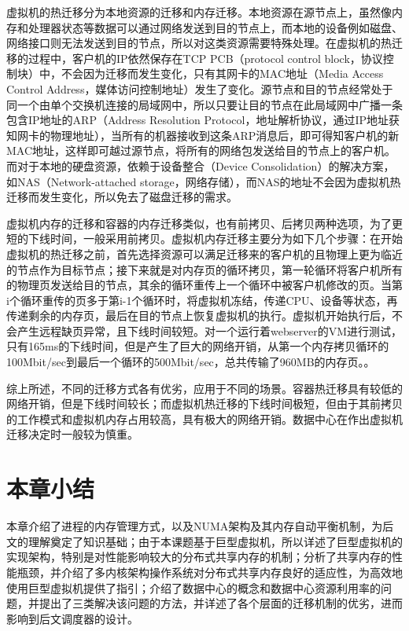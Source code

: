 虚拟机的热迁移\cite{livemigration}分为本地资源的迁移和内存迁移。本地资源在源节点上，虽然像内存和处理器状态等数据可以通过网络发送到目的节点上，而本地的设备例如磁盘、网络接口则无法发送到目的节点，所以对这类资源需要特殊处理。在虚拟机的热迁移的过程中，客户机的IP依然保存在TCP PCB（protocol control block，协议控制块）中，不会因为迁移而发生变化，只有其网卡的MAC地址（Media Access Control Address，媒体访问控制地址）发生了变化。源节点和目的节点经常处于同一个由单个交换机连接的局域网中，所以只要让目的节点在此局域网中广播一条包含IP地址的ARP（Address Resolution Protocol，地址解析协议，通过IP地址获知网卡的物理地址），当所有的机器接收到这条ARP消息后，即可得知客户机的新MAC地址，这样即可越过源节点，将所有的网络包发送给目的节点上的客户机。而对于本地的硬盘资源，依赖于设备整合（Device Consolidation）的解决方案，如NAS（Network-attached storage，网络存储），而NAS的地址不会因为虚拟机热迁移而发生变化，所以免去了磁盘迁移的需求。

虚拟机内存的迁移和容器的内存迁移类似，也有前拷贝、后拷贝两种选项，为了更短的下线时间，一般采用前拷贝。虚拟机内存迁移主要分为如下几个步骤：在开始虚拟机的热迁移之前，首先选择资源可以满足迁移来的客户机的且物理上更为临近的节点作为目标节点；接下来就是对内存页的循环拷贝，第一轮循环将客户机所有的物理页发送给目的节点，其余的循环重传上一个循环中被客户机修改的页。当第i个循环重传的页多于第i-1个循环时，将虚拟机冻结，传递CPU、设备等状态，再传递剩余的内存页，最后在目的节点上恢复虚拟机的执行。虚拟机开始执行后，不会产生远程缺页异常，且下线时间较短。对一个运行着webserver的VM进行测试，只有165ms的下线时间，但是产生了巨大的网络开销，从第一个内存拷贝循环的100Mbit/sec到最后一个循环的500Mbit/sec，总共传输了960MB的内存页。\cite{livemigration}。

综上所述，不同的迁移方式各有优劣，应用于不同的场景。容器热迁移具有较低的网络开销，但是下线时间较长；而虚拟机热迁移的下线时间极短，但由于其前拷贝的工作模式和虚拟机内存占用较高，具有极大的网络开销。数据中心在作出虚拟机迁移决定时一般较为慎重。

\section{本章小结}
本章介绍了进程的内存管理方式，以及NUMA架构及其内存自动平衡机制，为后文的理解奠定了知识基础；由于本课题基于巨型虚拟机，所以详述了巨型虚拟机的实现架构，特别是对性能影响较大的分布式共享内存的机制；分析了共享内存的性能瓶颈，并介绍了多内核架构操作系统对分布式共享内存良好的适应性，为高效地使用巨型虚拟机提供了指引；介绍了数据中心的概念和数据中心资源利用率的问题，并提出了三类解决该问题的方法，并详述了各个层面的迁移机制的优劣，进而影响到后文调度器的设计。